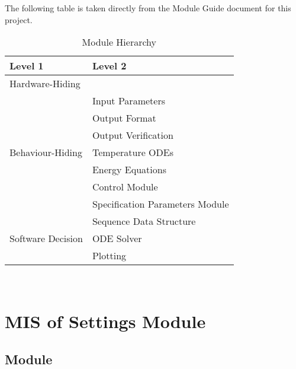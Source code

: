 \documentclass[12pt, titlepage]{article}
\begin{document}
The following table is taken directly from the Module Guide document for this project.

\begin{table}[h!]
  \centering
  \begin{tabular}{p{} p{}}
    \toprule
    \textbf{Level 1}                               & \textbf{Level 2}                \\
    \midrule

    {Hardware-Hiding}                              & ~                               \\
    \midrule

    \multirow{7}{0.3\textwidth}{Behaviour-Hiding}  & Input Parameters                \\
                                                   & Output Format                   \\
                                                   & Output Verification             \\
                                                   & Temperature ODEs                \\
                                                   & Energy Equations                \\
                                                   & Control Module                  \\
                                                   & Specification Parameters Module \\
    \midrule

    \multirow{3}{0.3\textwidth}{Software Decision} & {Sequence Data Structure}       \\
                                                   & ODE Solver                      \\
                                                   & Plotting                        \\
    \bottomrule
  \end{tabular}
  \caption{Module Hierarchy}
  \label{TblMH}
\end{table}

\newpage
~\newpage

\section{MIS of Settings Module} \label{Module_Settings}

\subsection{Module}
\end{document}
